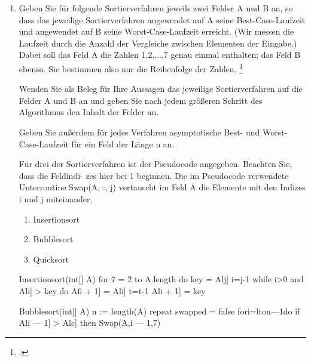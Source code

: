 \documentclass{bschlangaul-aufgabe}
\begin{document}

\begin{enumerate}


\item Geben Sie für folgende Sortierverfahren jeweils zwei Felder A und B
an, so dass das jeweilige Sortierverfahren angewendet auf A seine
Best-Case-Laufzeit und angewendet auf B seine Worst-Case-Laufzeit
erreicht. (Wir messen die Laufzeit durch die Anzahl der Vergleiche
zwischen Elementen der Eingabe.) Dabei soll das Feld A die Zahlen
1,2,...,7 genau einmal enthalten; das Feld B ebenso. Sie bestimmen also
nur die Reihenfolge der Zahlen.
\footcite{examen:46115:2021:03}

Wenden Sie als Beleg für Ihre Aussagen das jeweilige Sortierverfahren
auf die Felder A und B an und geben Sie nach jedem größeren Schritt des
Algorithmus den Inhalt der Felder an.

Geben Sie außerdem für jedes Verfahren asymptotische Best- und
Worst-Case-Laufzeit für ein Feld der Länge n an.

Für drei der Sortierverfahren ist der Pseudocode angegeben. Beachten
Sie, dass die Feldindi- zes hier bei 1 beginnen. Die im Pseudocode
verwendete Unterroutine Swap(A, :, j) vertauscht im Feld A die Elemente
mit den Indizes i und j miteinander.

\begin{enumerate}

\item Insertionsort

\item Bubblesort

\item Quicksort

\end{enumerate}
Insertionsort(int[] A)
for 7 = 2 to A.length do
key = Alj]
i=j-1
while i>0 and Ali] > key do
Afi + 1] = Ali]
t=t-1
Ali + 1] = key

Bubblesort(int|] A)
n := length(A)
repeat
swapped = false
fori=lton—1do
if Ali — 1] > Alc] then
Swap(A,i — 1,7)


\end{enumerate}
\end{document}
